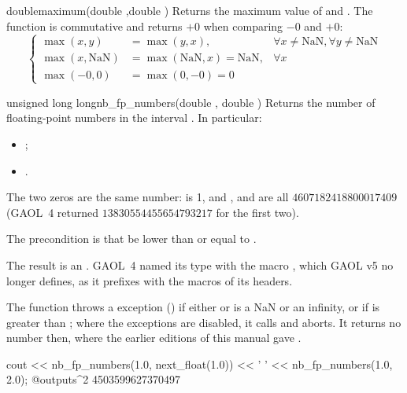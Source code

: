 \documentclass[12pt,a4paper,twoside,openright]{book}
\begin{document}
\begin{deffun}{double}{maximum}{(double ,double )}
  Returns the maximum  value of  and . The
  function is commutative and returns $+0$ when comparing $-0$ and $+0$:
\begin{equation*}
\left\{\begin{array}{lll}
  \max(x,y) &= \max(y,x), &\forall x\neq\text{NaN}, \forall y\neq\text{NaN} \\
  \max(x,\text{NaN})&=\max(\text{NaN},x)=\text{NaN}, &\forall x\\
  \max(-0,0)&=\max(0,-0)=0
\end{array}\right.
\end{equation*}
\end{deffun}

\begin{deffun}{unsigned long long}{nb\_fp\_numbers}{(double , double )}
  Returns the number of floating-point numbers in the interval
  . In particular:
  \begin{itemize}
  \item {};
  \item {}.
  \end{itemize}
  The two zeros are the same number:  is 1,
  and ,  and
   are all $4607182418800017409$ (GAOL~4
  returned $13830554455654793217$ for the first two).\newinvfive

  The precondition is that  be lower than or equal to .

  The result is an . GAOL~4 named its type with the
  macro , which GAOL v5 no longer defines, as it prefixes
  with  the macros of its headers.\newinvfive

  The function throws a  exception
  () if either  or  is a NaN or an
  infinity, or if  is greater than ; where the exceptions are
  disabled, it calls  and aborts. It returns no number
  then, where the earlier editions of this manual gave
  .\newinvfive
\begin{example}
cout << nb_fp_numbers(1.0, next_float(1.0)) << ' '
     << nb_fp_numbers(1.0, 2.0);
@outputs^2 4503599627370497~
\end{example}
\end{deffun}
\end{document}
